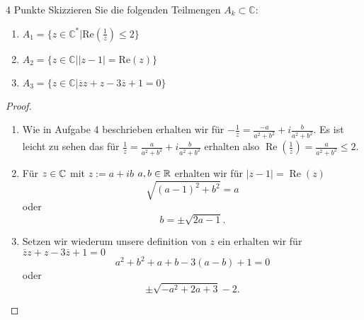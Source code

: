 \documentclass{../problemset}
\begin{document}
\begin{problem}{4 Punkte}
Skizzieren Sie die folgenden Teilmengen $A_k \subset \mathbb{C}$:
\begin{enumerate}
	\item $A_1 = \{z \in \mathbb{C}^* | \text{Re}\left(\frac{1}{z}\right) \leq 2\}$
	\item $A_2 = \{z \in \mathbb{C} | |z - 1| = \text{Re}(z)\}$
	\item $A_3 = \{z \in \mathbb{C} | \overline{z}z + z - 3\overline{z} + 1 = 0\}$
\end{enumerate}

\begin{proof}
	\leavevmode
	\begin{enumerate}
		\item Wie in Aufgabe 4 beschrieben erhalten wir für $- \frac{1}{z} =
			      \frac{-a}{a^2+b^2} + i\frac{b}{a^2+b^2}$. Es ist leicht zu sehen das für
		      $\frac{1}{z} = \frac{a}{a^2+b^2} + i\frac{b}{a^2+b^2}$ erhalten also
		      $\operatorname{Re}(\frac{1}{z}) = \frac{a}{a^2+b^2} \leq 2$.

		      \begin{center}
		      \end{center}
		\item Für $z \in \mathbb{C}$ mit $z := a +ib$ $a,b \in \mathbb{R}$ erhalten wir für $|z -
			      1| = \operatorname{Re}(z)$
		      \[
			      \sqrt{{(a-1)}^2 + b^2} = a
		      \] oder \[
			      b = \pm \sqrt{2a-1}.
		      \]

		      \begin{center}
		      \end{center}
		\item Setzen wir wiederum unsere definition von $z$ ein erhalten wir für
		      $\overline{z}z + z - 3\overline{z} + 1 = 0$ \[
                  a^{2}+b^{2}+a+b-3(a-b) + 1 = 0
		      \] oder \[
		          \pm \sqrt{ -a^2 +2a + 3 } - 2.
		      \]


\end{enumerate}
\end{proof}
\end{problem}
\end{document}
